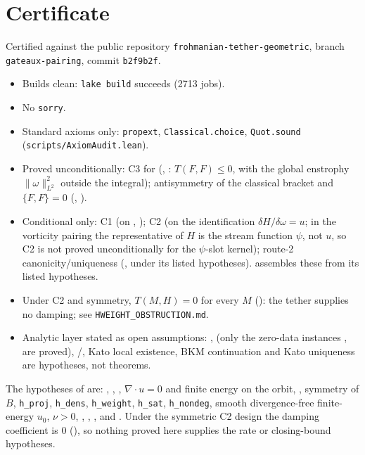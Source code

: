 \documentclass[11pt,a4paper]{article}
\theoremstyle{plain}
\theoremstyle{definition}
\theoremstyle{remark}
\begin{document}
\section{Certificate}\label{sec:certificate}
Certified against the public repository \texttt{frohmanian-tether-geometric}, branch \texttt{gateaux-pairing}, commit \texttt{b2f9b2f}.
\begin{itemize}
\item Builds clean: \texttt{lake build} succeeds (2713 jobs).
\item No \texttt{sorry}.
\item Standard axioms only: \texttt{propext}, \texttt{Classical.choice}, \texttt{Quot.sound} (\texttt{scripts/AxiomAudit.lean}).
\item Proved unconditionally: C3 for  (, : $T(F,F)\le0$, with the global enstrophy $\|\omega\|_{L^2}^2$ outside the integral); antisymmetry of the classical bracket and $\{F,F\}=0$ (, ).
\item Conditional only: C1 (on , ); C2 (on the identification $\delta H/\delta\omega=u$; in the vorticity pairing the representative of $H$ is the stream function $\psi$, not $u$, so C2 is not proved unconditionally for the $\psi$-slot kernel); route-2 canonicity/uniqueness (, under its listed hypotheses).  assembles these from its listed hypotheses.
\item Under C2 and symmetry, $T(M,H)=0$ for every $M$ (): the tether supplies no damping; see \texttt{HWEIGHT\_OBSTRUCTION.md}.
\item Analytic layer stated as open assumptions: ,  (only the zero-data instances ,  are proved), /, Kato local existence, BKM continuation and Kato uniqueness are hypotheses, not theorems.
\end{itemize}
The hypotheses of  are: , , , $\nabla\cdot u=0$ and finite energy on the orbit, , symmetry of $B$, \texttt{h\_proj}, \texttt{h\_dens}, \texttt{h\_weight}, \texttt{h\_sat}, \texttt{h\_nondeg}, smooth divergence-free finite-energy $u_0$, $\nu>0$, , , ,  and . Under the symmetric C2 design the damping coefficient is $0$ (), so nothing proved here supplies the rate or closing-bound hypotheses.
\end{document}
